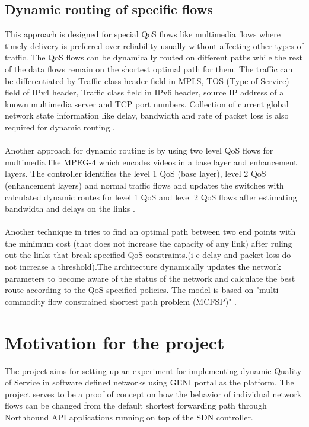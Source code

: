 \documentclass[paper=a4, fontsize=11pt]{scrartcl}	%
\numberwithin{equation}{section}		%
\numberwithin{figure}{section}			%
\numberwithin{table}{section}				%
\begin{document}
\subsection{Dynamic routing of specific flows}
This approach is designed for special QoS flows like multimedia flows where timely delivery is preferred over reliability usually without affecting other types of traffic. The QoS flows can be dynamically routed on different paths while the rest of the data flows remain on the shortest optimal path for them. The traffic can be differentiated by Traffic class header field in MPLS, TOS (Type of Service) field of IPv4 header, Traffic class field in IPv6 header, source IP address of a known multimedia server and TCP port numbers. Collection of current global network state information like delay, bandwidth and rate of packet loss is also required for dynamic routing \cite{openqos}.
\\
\\
Another approach for dynamic routing is by using two level QoS flows for multimedia like MPEG-4 which encodes videos in a base layer and enhancement layers. The controller identifies the level 1 QoS (base layer), level 2 QoS (enhancement layers) and normal traffic flows and updates the switches with calculated dynamic routes for level 1 QoS and level 2 QoS flows after estimating bandwidth and delays on the links \cite{video}.
\\
\\
Another technique in \cite{thesis} tries to find an optimal path between two end points with the minimum cost (that does not increase the capacity of any link) after ruling out the links that break specified QoS constraints.(i-e delay and packet loss do not increase a threshold).The architecture dynamically updates the network parameters to become aware of the status of the network and calculate the best route according to the QoS specified policies. The model is based on "multi-commodity flow constrained shortest path problem (MCFSP)" .

\section{Motivation for the project}
The project aims for setting up an experiment for implementing dynamic Quality of Service in software defined networks using GENI portal as the platform. The project serves to be a proof of concept on how the behavior of individual network flows can be changed from the default shortest forwarding path through Northbound API applications running on top of the SDN controller.
\end{document}
